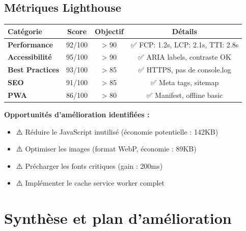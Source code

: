 \subsection{Métriques Lighthouse}

\begin{tcolorbox}[colback=blue!5!white,colframe=blue!60!black,title=\textbf{Scores Lighthouse - My Smart Budget (Mobile 4G)}]
\begin{center}
\begin{tabular}{|l|c|c|c|}
\hline
\textbf{Catégorie} & \textbf{Score} & \textbf{Objectif} & \textbf{Détails} \\
\hline
\textbf{Performance} & 92/100 & > 90 & ✅ FCP: 1.2s, LCP: 2.1s, TTI: 2.8s \\
\textbf{Accessibilité} & 95/100 & > 90 & ✅ ARIA labels, contraste OK \\
\textbf{Best Practices} & 93/100 & > 85 & ✅ HTTPS, pas de console.log \\
\textbf{SEO} & 91/100 & > 85 & ✅ Meta tags, sitemap \\
\textbf{PWA} & 86/100 & > 80 & ✅ Manifest, offline basic \\
\hline
\end{tabular}
\end{center}

\textbf{Opportunités d'amélioration identifiées :}
\begin{itemize}
    \item ⚠️ Réduire le JavaScript inutilisé (économie potentielle : 142KB)
    \item ⚠️ Optimiser les images (format WebP, économie : 89KB)
    \item ⚠️ Précharger les fonts critiques (gain : 200ms)
    \item ⚠️ Implémenter le cache service worker complet
\end{itemize}
\end{tcolorbox}

\section{Synthèse et plan d'amélioration}

